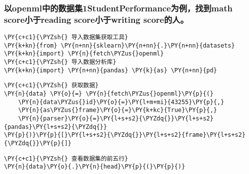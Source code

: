     \hypertarget{ux4ee5openmlux4e2dux7684ux6570ux636eux96c61studentperformanceux4e3aux4f8bux627eux5230math-scoreux5c0fux4e8ereading-scoreux5c0fux4e8ewriting-scoreux7684ux4eba}{%
\subsubsection{以openml中的数据集1StudentPerformance为例，找到math
score小于reading score小于writing
score的人。}\label{ux4ee5openmlux4e2dux7684ux6570ux636eux96c61studentperformanceux4e3aux4f8bux627eux5230math-scoreux5c0fux4e8ereading-scoreux5c0fux4e8ewriting-scoreux7684ux4eba}}

    \begin{tcolorbox}[breakable, size=fbox, boxrule=1pt, pad at break*=1mm,colback=cellbackground, colframe=cellborder]
\begin{Verbatim}[commandchars=\\\{\}]
\PY{c+c1}{\PYZsh{} 导入数据集获取工具}
\PY{k+kn}{from} \PY{n+nn}{sklearn}\PY{n+nn}{.}\PY{n+nn}{datasets} \PY{k+kn}{import} \PY{n}{fetch\PYZus{}openml}
\PY{c+c1}{\PYZsh{} 导入数据分析库}
\PY{k+kn}{import} \PY{n+nn}{pandas} \PY{k}{as} \PY{n+nn}{pd}
\end{Verbatim}
\end{tcolorbox}

    \begin{tcolorbox}[breakable, size=fbox, boxrule=1pt, pad at break*=1mm,colback=cellbackground, colframe=cellborder]
\begin{Verbatim}[commandchars=\\\{\}]
\PY{c+c1}{\PYZsh{} 获取数据}
\PY{n}{data} \PY{o}{=} \PY{n}{fetch\PYZus{}openml}\PY{p}{(}
    \PY{n}{data\PYZus{}id}\PY{o}{=}\PY{l+m+mi}{43255}\PY{p}{,}
    \PY{n}{as\PYZus{}frame}\PY{o}{=}\PY{k+kc}{True}\PY{p}{,}
    \PY{n}{parser}\PY{o}{=}\PY{l+s+s2}{\PYZdq{}}\PY{l+s+s2}{pandas}\PY{l+s+s2}{\PYZdq{}}
\PY{p}{)}\PY{p}{[}\PY{l+s+s2}{\PYZdq{}}\PY{l+s+s2}{frame}\PY{l+s+s2}{\PYZdq{}}\PY{p}{]}
\end{Verbatim}
\end{tcolorbox}

    \begin{tcolorbox}[breakable, size=fbox, boxrule=1pt, pad at break*=1mm,colback=cellbackground, colframe=cellborder]
\begin{Verbatim}[commandchars=\\\{\}]
\PY{c+c1}{\PYZsh{} 查看数据集的前五行}
\PY{n}{data}\PY{o}{.}\PY{n}{head}\PY{p}{(}\PY{p}{)}
\end{Verbatim}
\end{tcolorbox}

